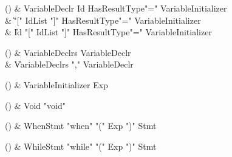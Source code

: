 \begin{bbgrammarappendix}{3.7in}

() & VariableDeclr \label{prod:VariableDeclr}  \: Id HasResultType\opt \xcd"=" VariableInitializer  \\

 &    \| \xcd"[" IdList \xcd"]" HasResultType\opt \xcd"=" VariableInitializer \\
 &    \| Id \xcd"[" IdList \xcd"]" HasResultType\opt \xcd"=" VariableInitializer \\

\end{bbgrammarappendix}

\begin{bbgrammarappendix}{3.6in}

() & VariableDeclrs \label{prod:VariableDeclrs}  \: VariableDeclr  \\

 &    \| VariableDeclrs \xcd"," VariableDeclr \\

\end{bbgrammarappendix}

\begin{bbgrammarappendix}{3.1in}

() & VariableInitializer \label{prod:VariableInitializer}  \: Exp  \\


\end{bbgrammarappendix}

\begin{bbgrammarappendix}{4.6in}

() & Void \label{prod:Void}  \: \xcd"void"  \\


\end{bbgrammarappendix}

\begin{bbgrammarappendix}{4.2in}

() & WhenStmt \label{prod:WhenStmt}  \: \xcd"when" \xcd"(" Exp \xcd")" Stmt  \\


\end{bbgrammarappendix}

\begin{bbgrammarappendix}{4.1in}

() & WhileStmt \label{prod:WhileStmt}  \: \xcd"while" \xcd"(" Exp \xcd")" Stmt  \\


\end{bbgrammarappendix}
